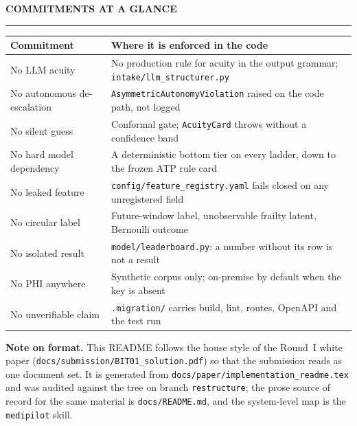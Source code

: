 \documentclass[10pt,a4paper,twocolumn]{article}
\newcommand{\pth}[1]{\textcolor{SecPurple}{\texttt{#1}}}
\newcommand{\cm}[1]{\texttt{#1}}
\begin{document}
\vspace{9pt}
{\sffamily\bfseries\small\color{NearBlack}COMMITMENTS AT A GLANCE}\par
\vspace{-1pt}\noindent\textcolor{AccPurple}{\rule{\linewidth}{1pt}}\par\vspace{3pt}

{\footnotesize\sffamily
\begin{tabular}{@{}p{1.85cm}p{5.5cm}@{}}
\toprule
\rowcolor{AccPurple!10}
\textbf{Commitment} & \textbf{Where it is enforced in the code}\\
\midrule
No LLM acuity & No production rule for acuity in the output grammar; \pth{intake/llm\_structurer.py}\\
\addlinespace[2pt]
No autonomous de-escalation & \cm{AsymmetricAutonomyViolation} raised on the code path, not logged\\
\addlinespace[2pt]
No silent guess & Conformal gate; \cm{AcuityCard} throws without a confidence band\\
\addlinespace[2pt]
No hard model dependency & A deterministic bottom tier on every ladder, down to the frozen ATP rule card\\
\addlinespace[2pt]
No leaked feature & \pth{config/feature\_registry.yaml} fails closed on any unregistered field\\
\addlinespace[2pt]
No circular label & Future-window label, unobservable frailty latent, Bernoulli outcome\\
\addlinespace[2pt]
No isolated result & \pth{model/leaderboard.py}: a number without its row is not a result\\
\addlinespace[2pt]
No PHI anywhere & Synthetic corpus only; on-premise by default when the key is absent\\
\addlinespace[2pt]
No unverifiable claim & \pth{.migration/} carries build, lint, routes, OpenAPI and the test run\\
\bottomrule
\end{tabular}}

\vspace{7pt}
{\scriptsize\color{MedGray}\textbf{Note on format.} This README follows the house style of the
Round~I white paper (\pth{docs/submission/BIT01\_solution.pdf}) so that the submission reads as one
document set. It is generated from \pth{docs/paper/implementation\_readme.tex} and was audited
against the tree on branch \cm{restructure}; the prose source of record for the same material is
\pth{docs/README.md}, and the system-level map is the \cm{medipilot} skill.}
\end{document}
